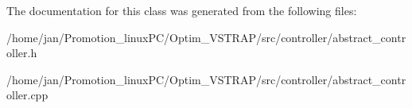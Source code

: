 The documentation for this class was generated from the following files\+:\begin{DoxyCompactItemize}
\item 
/home/jan/\+Promotion\+\_\+linux\+P\+C/\+Optim\+\_\+\+V\+S\+T\+R\+A\+P/src/controller/abstract\+\_\+controller.\+h\item 
/home/jan/\+Promotion\+\_\+linux\+P\+C/\+Optim\+\_\+\+V\+S\+T\+R\+A\+P/src/controller/abstract\+\_\+controller.\+cpp\end{DoxyCompactItemize}
